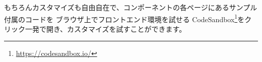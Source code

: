 \begin{reviewimage}%
%
\label{image:03-todo-with-react:mui-sample}
\end{reviewimage}

もちろんカスタマイズも自由自在で、コンポーネントの各ページにあるサンプル付属のコードを
ブラウザ上でフロントエンド環境を試せる
CodeSandbox\footnote{\url{https://codesandbox.io/}}をクリック一発で開き、カスタマイズを試すことができます。

